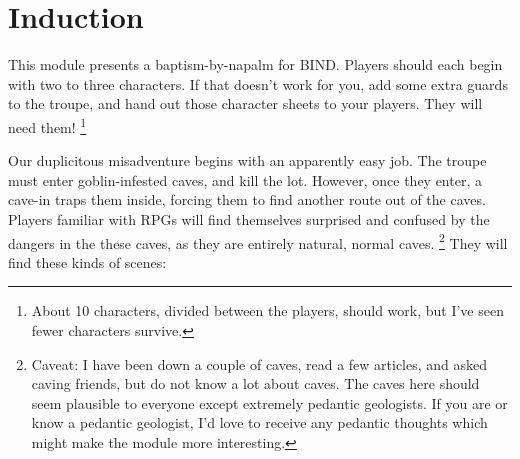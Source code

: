 \section{Induction}

\begin{multicols}{2}

\noindent
This module presents a baptism-by-napalm for BIND.
Players should each begin with two to three characters.
If that doesn't work for you, add some extra \glspl{guard} to the troupe, and hand out those character sheets to your players.
They will need them!%
\footnote{About 10 characters, divided between the players, should work, but I've seen fewer characters survive.}

Our duplicitous misadventure begins with an apparently easy job.
The troupe must enter goblin-infested caves, and kill the lot.
However, once they enter, a cave-in traps them inside, forcing them to find another route out of the caves.
Players familiar with RPGs will find themselves surprised and confused by the dangers in the these caves, as they are entirely natural, normal caves.%
\footnote{Caveat: I have been down a couple of caves, read a few articles, and asked caving friends, but do not know a lot about caves.
The caves here should seem plausible to everyone except extremely pedantic geologists.
If you are or know a pedantic geologist, I'd love to receive any pedantic thoughts which might make the module more interesting.}
They will find these kinds of scenes:


\end{multicols}
